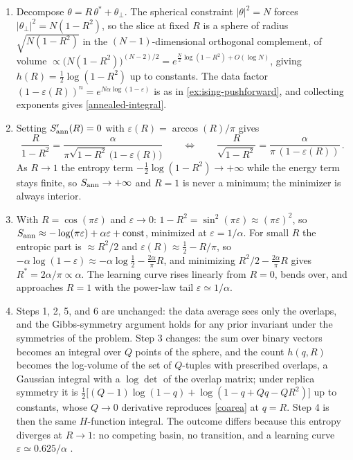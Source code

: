 \documentclass[11pt]{article}
\begin{document}
\begin{solution}[ex:annealed]
\begin{enumerate}
  \item Decompose $\theta = R\,\theta^* + \theta_\perp$. The spherical constraint $|\theta|^2 = N$ forces $|\theta_\perp|^2 = N(1-R^2)$, so the slice at fixed $R$ is a sphere of radius $\sqrt{N(1-R^2)}$ in the $(N-1)$-dimensional orthogonal complement, of volume $\propto\big(N(1-R^2)\big)^{(N-2)/2} = e^{\frac{N}{2}\log(1-R^2)+O(\log N)}$, giving $h(R) = \frac{1}{2}\log(1-R^2)$ up to constants. The data factor $(1-\varepsilon(R))^n = e^{N\alpha\log(1-\varepsilon)}$ is as in \cref{ex:ising-pushforward}, and collecting exponents gives \eqref{annealed-integral}.

  \item Setting $S_{\rm ann}'(R) = 0$ with $\varepsilon(R) = \arccos(R)/\pi$ gives
%
\begin{equation*}
    \frac{R}{1-R^2} = \frac{\alpha}{\pi\sqrt{1-R^2}\,\big(1-\varepsilon(R)\big)}
    \qquad\Longleftrightarrow\qquad
    \frac{R}{\sqrt{1-R^2}} = \frac{\alpha}{\pi\,(1-\varepsilon(R))}\,.
\end{equation*}
%
As $R\to1$ the entropy term $-\frac{1}{2}\log(1-R^2)\to+\infty$ while the energy term stays finite, so $S_{\rm ann}\to+\infty$ and $R=1$ is never a minimum; the minimizer is always interior.

  \item With $R = \cos(\pi\varepsilon)$ and $\varepsilon\to0$: $1-R^2 = \sin^2(\pi\varepsilon)\approx(\pi\varepsilon)^2$, so $S_{\rm ann}\approx-\log(\pi\varepsilon)+\alpha\varepsilon+\text{const}$, minimized at $\varepsilon = 1/\alpha$. For small $R$ the entropic part is $\approx R^2/2$ and $\varepsilon(R)\approx\frac{1}{2}-R/\pi$, so $-\alpha\log(1-\varepsilon)\approx-\alpha\log\frac{1}{2}-\frac{2\alpha}{\pi}R$, and minimizing $R^2/2-\frac{2\alpha}{\pi}R$ gives $R^* = 2\alpha/\pi\propto\alpha$. The learning curve rises linearly from $R=0$, bends over, and approaches $R=1$ with the power-law tail $\varepsilon\simeq1/\alpha$.

  \item Steps 1, 2, 5, and 6 are unchanged: the data average sees only the overlaps, and the Gibbs-symmetry argument holds for any prior invariant under the symmetries of the problem. Step 3 changes: the sum over binary vectors becomes an integral over $Q$ points of the sphere, and the count $h(q,R)$ becomes the log-volume of the set of $Q$-tuples with prescribed overlaps, a Gaussian integral with a $\log\det$ of the overlap matrix; under replica symmetry it is $\frac{1}{2}\big[(Q-1)\log(1-q) + \log(1-q+Qq-QR^2)\big]$ up to constants, whose $Q\to0$ derivative reproduces \eqref{coarea} at $q=R$. Step 4 is then the same $H$-function integral. The outcome differs because this entropy diverges at $R\to1$: no competing basin, no transition, and a learning curve $\varepsilon\simeq0.625/\alpha$ \cite{seung1992statistical}.
\end{enumerate}
\end{solution}
\end{document}
